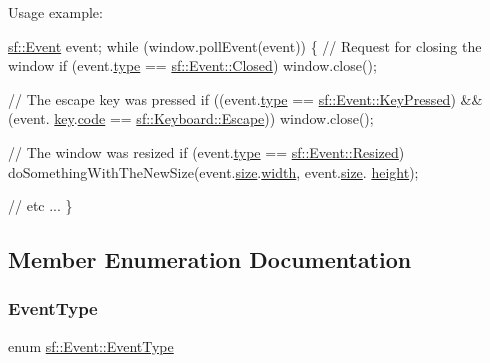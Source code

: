 Usage example\+: 
\begin{DoxyCode}
\hyperlink{classsf_1_1_event}{sf::Event} event;
\textcolor{keywordflow}{while} (window.pollEvent(event))
\{
    \textcolor{comment}{// Request for closing the window}
    \textcolor{keywordflow}{if} (event.\hyperlink{classsf_1_1_event_adf2f8044f713fd9d6019077b0d1ffe0a}{type} == \hyperlink{classsf_1_1_event_af41fa9ed45c02449030699f671331d4aa316e4212e083f1dce79efd8d9e9c0a95}{sf::Event::Closed})
        window.close();

    \textcolor{comment}{// The escape key was pressed}
    \textcolor{keywordflow}{if} ((event.\hyperlink{classsf_1_1_event_adf2f8044f713fd9d6019077b0d1ffe0a}{type} == \hyperlink{classsf_1_1_event_af41fa9ed45c02449030699f671331d4aac3c7abfaa98c73bfe6be0b57df09c71b}{sf::Event::KeyPressed}) && (event.
      \hyperlink{classsf_1_1_event_a45b92fc6757ca7c193f06b302e424ab0}{key}.\hyperlink{structsf_1_1_event_1_1_key_event_a2879fdab8a68cb1c6ecc45730a2d0e61}{code} == \hyperlink{classsf_1_1_keyboard_acb4cacd7cc5802dec45724cf3314a142a64b7ecb543c5d03bec8383dde123c95d}{sf::Keyboard::Escape}))
        window.close();

    \textcolor{comment}{// The window was resized}
    \textcolor{keywordflow}{if} (event.\hyperlink{classsf_1_1_event_adf2f8044f713fd9d6019077b0d1ffe0a}{type} == \hyperlink{classsf_1_1_event_af41fa9ed45c02449030699f671331d4aa67fd26d7e520bc6722db3ff47ef24941}{sf::Event::Resized})
        doSomethingWithTheNewSize(event.\hyperlink{classsf_1_1_event_a85dae56a377eeffd39183c3f6fc96cb9}{size}.\hyperlink{structsf_1_1_event_1_1_size_event_a20ea1b78c9bb1604432f8f0067bbfd94}{width}, event.\hyperlink{classsf_1_1_event_a85dae56a377eeffd39183c3f6fc96cb9}{size}.
      \hyperlink{structsf_1_1_event_1_1_size_event_af0f76a599d5f48189cb8d78d4e5facdb}{height});

    \textcolor{comment}{// etc ...}
\}
\end{DoxyCode}
 

\subsection{Member Enumeration Documentation}
\mbox{\label{classsf_1_1_event_af41fa9ed45c02449030699f671331d4a}} 
\subsubsection{\texorpdfstring{Event\+Type}{EventType}}
{\footnotesize\ttfamily enum \hyperlink{classsf_1_1_event_af41fa9ed45c02449030699f671331d4a}{sf\+::\+Event\+::\+Event\+Type}}



